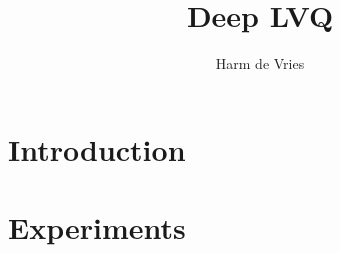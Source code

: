 \documentclass[10pt]{article}
\title{Deep LVQ}
\author{Harm de Vries}
\begin{document}
\maketitle

\section{Introduction}

\section{}

\section{Experiments}
\end{document}
